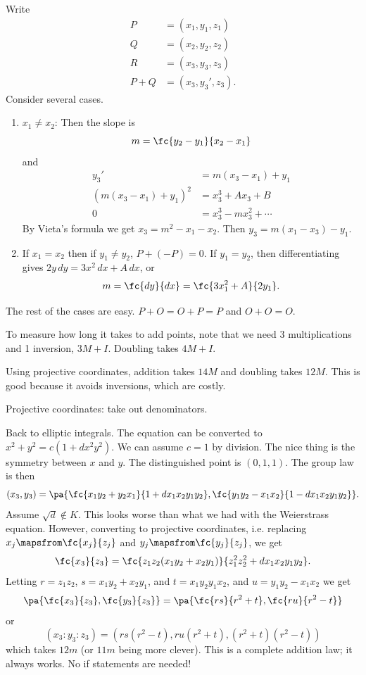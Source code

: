 Write
\begin{align*}
P&=(x_1,y_1,z_1)\\
Q&=(x_2,y_2, z_2)\\
R&=(x_3,y_3,z_3)\\
P+Q&=(x_3,y_3',z_3).
\end{align*}
Consider several cases.
\begin{enumerate}
\item
$x_1\ne x_2$: Then the slope is
\[m=\fc{y_2-y_1}{x_2-x_1}\]
and
\begin{align*}
y_3'&=m(x_3-x_1)+y_1\\
(m(x_3-x_1)+y_1)^2&=x_3^3 +Ax_3+B\\
0&=x_3^3-mx_3^2+\cdots 
\end{align*}
By Vieta's formula we get 
$x_3=m^2-x_1-x_2$. Then $y_3=m(x_1-x_3)-y_1$. 
\item If $x_1=x_2$ then if $y_1\ne y_2$, $P+(-P)=0$.
If $y_1=y_2$, then differentiating gives $2y\,dy =3x^2\,dx+A\,dx$, or
\[
m=\fc{dy}{dx}=\fc{3x_1^2+A}{2y_1}.
\]
\end{enumerate}
The rest of the cases are easy. $P+O=O+P=P$ and $O+O=O$.
\begin{rem}
To measure how long it takes to add points, note that we need 3 multiplications and 1 inversion, $3M+I$. Doubling takes $4M+I$.

Using projective coordinates, addition takes $14M$ and doubling takes $12M$. This is good because it avoids inversions, which are costly.
\end{rem}
Projective coordinates: take out denominators.

Back to elliptic integrals. The equation can be converted to $x^2+y^2=c(1+dx^2y^2)$. We can assume $c=1$ by division. The nice thing is the symmetry between $x$ and $y$.
The distinguished point is $(0,1,1)$. The group law is then
\[
(x_3,y_3)=\pa{
\fc{x_1y_2+y_2x_1}{1+dx_1x_2y_1y_2}, \fc{y_1y_2-x_1x_2}{1-dx_1x_2y_1y_2}
}.
\]
Assume $\sqrt{d}\nin K$. This looks worse than what we had with the Weierstrass  equation. However, converting to projective coordinates, i.e. replacing $x_j\mapsfrom \fc{x_j}{z_j}$ and $y_j\mapsfrom \fc{y_j}{z_j}$, we get
\[
\fc{x_3}{z_3}=\fc{z_1z_2(x_1y_2+x_2y_1)}{z_1^2z_2^2+dx_1x_2y_1y_2}.
\]
Letting $r=z_1z_2$, $s=x_1y_2+x_2y_1$, and $t=x_1y_2y_1x_2$, and $u=y_1y_2-x_1x_2$ we get 
\[
\pa{\fc{x_3}{z_3},\fc{y_3}{z_3}}=\pa{\fc{rs}{r^2+t}, \fc{ru}{r^2-t}}
\]
or
\[
(x_3:y_3:z_3)=(rs(r^2-t), ru(r^2+t), (r^2+t)(r^2-t))
\]
which takes $12m$ (or $11m$ being more clever). This is a complete addition law; it always works.
No if statements are needed!

